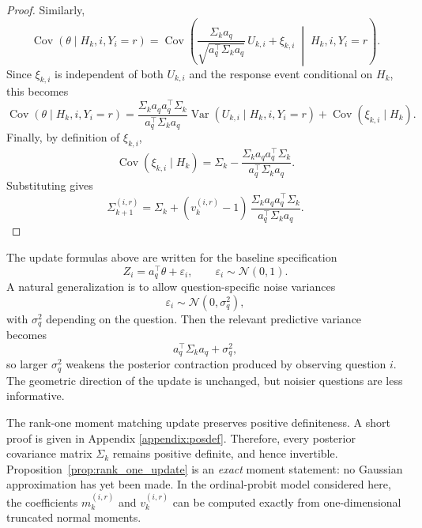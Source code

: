 \documentclass{article}
\begin{document}
\begin{proof}
Similarly,
\begin{equation*}
\operatorname{Cov}(\theta\mid H_k,i,Y_i=r)
=
\operatorname{Cov}\!\left(
\frac{\Sigma_k a_q}{\sqrt{a_q^\top\Sigma_k a_q}}\,U_{k,i}
+\xi_{k,i}
\;\middle|\;H_k,i,Y_i=r
\right).
\end{equation*}
Since $\xi_{k,i}$ is independent of both $U_{k,i}$ and the response event conditional on $H_k$,
this becomes
\begin{equation*}
\operatorname{Cov}(\theta\mid H_k,i,Y_i=r)
=
\frac{\Sigma_k a_q a_q^\top\Sigma_k}{a_q^\top\Sigma_k a_q}
\operatorname{Var}(U_{k,i}\mid H_k,i,Y_i=r)
+
\operatorname{Cov}(\xi_{k,i}\mid H_k).
\end{equation*}
Finally, by definition of $\xi_{k,i}$,
\begin{equation*}
\operatorname{Cov}(\xi_{k,i}\mid H_k)
=
\Sigma_k-
\frac{\Sigma_k a_q a_q^\top\Sigma_k}{a_q^\top\Sigma_k a_q}.
\end{equation*}
Substituting gives
\begin{equation*}
\Sigma_{k+1}^{(i,r)}
=
\Sigma_k+
(v_{k}^{(i,r)}-1)\,
\frac{\Sigma_k a_q a_q^\top\Sigma_k}{a_q^\top\Sigma_k a_q}.
\end{equation*}
\end{proof}
\begin{remark}\label{rem:question_noise}
The update formulas above are written for the baseline specification
\begin{equation*}
Z_i = a_q^\top \theta + \varepsilon_i,
\qquad
\varepsilon_i \sim \mathcal N(0,1).
\end{equation*}
A natural generalization is to allow question-specific noise variances
\begin{equation*}
\varepsilon_i \sim \mathcal N(0,\sigma_q^2),
\end{equation*}
with $\sigma_q^2$ depending on the question. Then the relevant predictive variance becomes
\begin{equation*}
a_q^\top \Sigma_k a_q + \sigma_q^2,
\end{equation*}
so larger $\sigma_q^2$ weakens the posterior contraction produced by observing question $i$.
The geometric direction of the update is unchanged, but noisier questions are less informative.
\end{remark}

The rank-one moment matching update preserves positive definiteness.  A short proof is given in Appendix \ref{appendix:posdef}. Therefore, every posterior
covariance matrix $\Sigma_k$ remains positive definite, and hence invertible.
Proposition~\ref{prop:rank_one_update} is an \emph{exact} moment statement: no Gaussian
approximation has yet been made. In the ordinal-probit model considered here, the coefficients $m_{k}^{(i,r)}$ and $v_{k}^{(i,r)}$
can be computed exactly from one-dimensional truncated normal moments.
\end{document}
